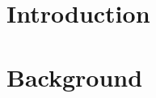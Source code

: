 \documentclass[twoside,11pt]{PhDthesisPSnPDF}
\begin{document}
\chapter{Introduction}\label{s:introduction}
\chapter{Background}\label{s:background}      
            






\renewcommand{\bibname}{References} %



%





\end{document}
